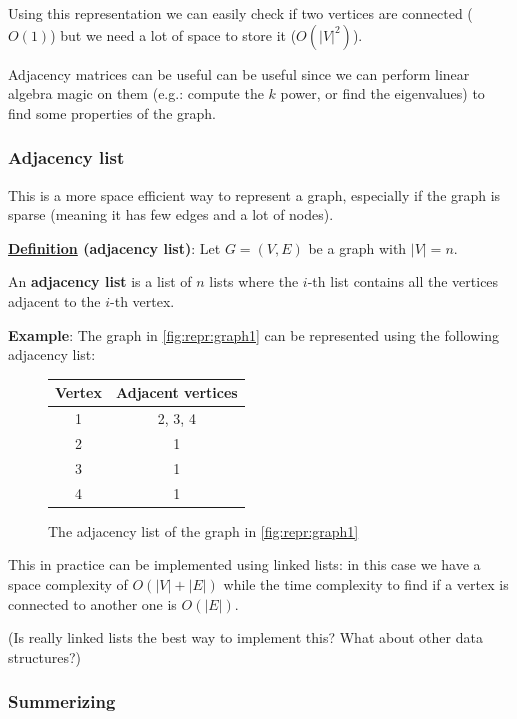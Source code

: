 \documentclass[12pt]{extarticle}
\begin{document}
Using this representation we can easily check if two vertices are connected ($O(1)$) but we need a lot of space to store it ($O(|V|^2)$).

Adjacency matrices can be useful can be useful since we can perform linear algebra magic on them
(e.g.: compute the $k$ power, or find the eigenvalues) to find some properties of the graph.

\subsubsection{Adjacency list}

This is a more space efficient way to represent a graph, especially if the graph is sparse (meaning it has few edges and a lot of nodes).

\textbf{\underline{Definition} (adjacency list)}:
Let $G = (V, E)$ be a graph with $|V| = n$.

An \textbf{adjacency list} is a list of $n$ lists where the $i$-th list contains all the vertices adjacent to the $i$-th vertex.

\textbf{Example}: The graph in \ref{fig:repr:graph1} can be represented using the following adjacency list:

\begin{figure}[H]
    \centering
    \begin{tabular}{c|c}
        Vertex & Adjacent vertices \\
        \hline
        1      & 2, 3, 4           \\
        2      & 1                 \\
        3      & 1                 \\
        4      & 1
    \end{tabular}
    \caption{The adjacency list of the graph in \ref{fig:repr:graph1}}
    \label{fig:repr:adjlist1}
\end{figure}

This in practice can be implemented using linked lists: in this case we have a space complexity of $O(|V| + |E|)$ while the time complexity to find if a vertex is connected to another one is $O(|E|)$.

(Is really linked lists the best way to implement this? What about other data structures?)

\subsubsection{Summerizing}
\end{document}
